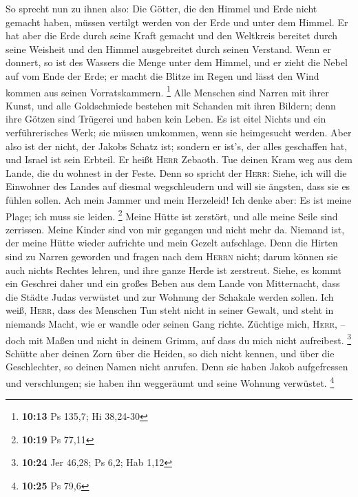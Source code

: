  So sprecht nun zu ihnen also: Die Götter, die den Himmel
und Erde nicht gemacht haben, müssen vertilgt werden von der Erde und
unter dem Himmel.  Er hat aber die Erde durch seine Kraft
gemacht und den Weltkreis bereitet durch seine Weisheit und den Himmel
ausgebreitet durch seinen Verstand.  Wenn er donnert, so
ist des Wassers die Menge unter dem Himmel, und er zieht die Nebel auf
vom Ende der Erde; er macht die Blitze im Regen und lässt den Wind
kommen aus seinen Vorratskammern. \footnote{\textbf{10:13} Ps 135,7; Hi
  38,24-30}  Alle Menschen sind Narren mit ihrer Kunst,
und alle Goldschmiede bestehen mit Schanden mit ihren Bildern; denn ihre
Götzen sind Trügerei und haben kein Leben.  Es ist eitel
Nichts und ein verführerisches Werk; sie müssen umkommen, wenn sie
heimgesucht werden.  Aber also ist der nicht, der Jakobs
Schatz ist; sondern er ist's, der alles geschaffen hat, und Israel ist
sein Erbteil. Er heißt \textsc{Herr} Zebaoth.  Tue deinen
Kram weg aus dem Lande, die du wohnest in der Feste. 
Denn so spricht der \textsc{Herr}: Siehe, ich will die Einwohner des
Landes auf diesmal wegschleudern und will sie ängsten, dass sie es
fühlen sollen.  Ach mein Jammer und mein Herzeleid! Ich
denke aber: Es ist meine Plage; ich muss sie leiden. \footnote{\textbf{10:19}
  Ps 77,11}  Meine Hütte ist zerstört, und alle meine
Seile sind zerrissen. Meine Kinder sind von mir gegangen und nicht mehr
da. Niemand ist, der meine Hütte wieder aufrichte und mein Gezelt
aufschlage.  Denn die Hirten sind zu Narren geworden und
fragen nach dem \textsc{Herrn} nicht; darum können sie auch nichts
Rechtes lehren, und ihre ganze Herde ist zerstreut. 
Siehe, es kommt ein Geschrei daher und ein großes Beben aus dem Lande
von Mitternacht, dass die Städte Judas verwüstet und zur Wohnung der
Schakale werden sollen.  Ich weiß, \textsc{Herr}, dass
des Menschen Tun steht nicht in seiner Gewalt, und steht in niemands
Macht, wie er wandle oder seinen Gang richte.  Züchtige
mich, \textsc{Herr}, -- doch mit Maßen und nicht in deinem Grimm, auf
dass du mich nicht aufreibest. \footnote{\textbf{10:24} Jer 46,28; Ps
  6,2; Hab 1,12}  Schütte aber deinen Zorn über die
Heiden, so dich nicht kennen, und über die Geschlechter, so deinen Namen
nicht anrufen. Denn sie haben Jakob aufgefressen und verschlungen; sie
haben ihn weggeräumt und seine Wohnung verwüstet. \footnote{\textbf{10:25}
  Ps 79,6}

